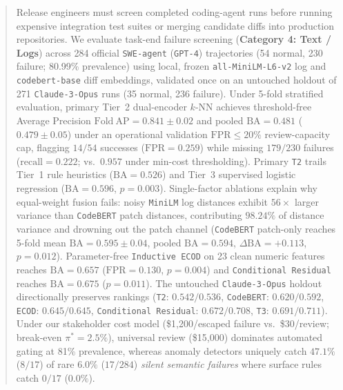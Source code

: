 \begin{abstract}
Release engineers must screen completed coding-agent runs before running expensive integration test suites or merging candidate diffs into production repositories. We evaluate task-end failure screening (\textbf{Category 4: Text / Logs}) across 284 official \texttt{SWE-agent} (\texttt{GPT-4}) trajectories (54 normal, 230 failure; 80.99\% prevalence) using local, frozen \texttt{all-MiniLM-L6-v2} log and \texttt{codebert-base} diff embeddings, validated once on an untouched holdout of 271 \texttt{Claude-3-Opus} runs (35 normal, 236 failure). Under 5-fold stratified evaluation, primary Tier~2 dual-encoder $k$-NN achieves threshold-free Average Precision $\mathrm{Fold\ AP}=0.841\pm 0.02$ and pooled $\mathrm{BA}=0.481$ ($0.479\pm 0.05$) under an operational validation $\mathrm{FPR}\le 20\%$ review-capacity cap, flagging $14/54$ successes ($\mathrm{FPR}=0.259$) while missing $179/230$ failures ($\mathrm{recall}=0.222$; vs.\ $0.957$ under min-cost thresholding). Primary \texttt{T2} trails Tier~1 rule heuristics ($\mathrm{BA}=0.526$) and Tier~3 supervised logistic regression ($\mathrm{BA}=0.596$, $p=0.003$). Single-factor ablations explain why equal-weight fusion fails: noisy \texttt{MiniLM} log distances exhibit $56\times$ larger variance than \texttt{CodeBERT} patch distances, contributing $98.24\%$ of distance variance and drowning out the patch channel (\texttt{CodeBERT} patch-only reaches 5-fold mean $\mathrm{BA}=0.595\pm 0.04$, pooled $\mathrm{BA}=0.594$, $\Delta\mathrm{BA}=+0.113$, $p=0.012$). Parameter-free \texttt{Inductive ECOD} on 23 clean numeric features reaches $\mathrm{BA}=0.657$ ($\mathrm{FPR}=0.130$, $p=0.004$) and \texttt{Conditional Residual} reaches $\mathrm{BA}=0.675$ ($p=0.011$). The untouched \texttt{Claude-3-Opus} holdout directionally preserves rankings (\texttt{T2}: $0.542/0.536$, \texttt{CodeBERT}: $0.620/0.592$, \texttt{ECOD}: $0.645/0.645$, \texttt{Conditional Residual}: $0.672/0.708$, \texttt{T3}: $0.691/0.711$). Under our stakeholder cost model (\$1,200/escaped failure vs.\ \$30/review; break-even $\pi^*=2.5\%$), universal review (\$15,000) dominates automated gating at 81\% prevalence, whereas anomaly detectors uniquely catch $47.1\%$ ($8/17$) of rare $6.0\%$ ($17/284$) \emph{silent semantic failures} where surface rules catch $0/17$ ($0.0\%$).
\end{abstract}

